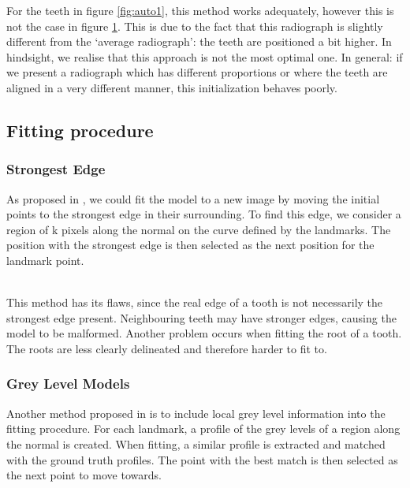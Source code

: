 \documentclass[11pt]{article}
\begin{document}
\begin{figure}[H]
\begin{minipage}{.5\textwidth}
  \label{fig:auto2}
\end{minipage}
\end{figure}
For the teeth in figure \ref{fig:auto1}, this method works adequately, however this is not the case in figure \ref{fig:auto2}. This is due to the fact that this radiograph is slightly different from the `average radiograph': the teeth are positioned a bit higher.
In hindsight, we realise that this approach is not the most optimal one. In general: if we present a radiograph which has different proportions or where the teeth are aligned in a very different manner, this initialization behaves poorly. 

\subsection{Fitting procedure}

\subsubsection{Strongest Edge}\label{sec:stredge}

As proposed in \cite{cootes2000introduction}, we could fit the model to a new image by moving the initial points to the strongest edge in their surrounding. To find this edge, we consider a region of k pixels along the normal on the curve defined by the landmarks. The position with the strongest edge is then selected as the next position for the landmark point.

~\\This method has its flaws, since the real edge of a tooth is not necessarily the strongest edge present. Neighbouring teeth may have stronger edges, causing the model to be malformed. Another problem occurs when fitting the root of a tooth. The roots are less clearly delineated and therefore harder to fit to.

\subsubsection{Grey Level Models}\label{glms}

Another method proposed in \cite{cootes2000introduction} is to include local grey level information into the fitting procedure. For each landmark, a profile of the grey levels of a region along the normal is created. When fitting, a similar profile is extracted and matched with the ground truth profiles. The point with the best match is then selected as the next point to move towards.
\end{document}
